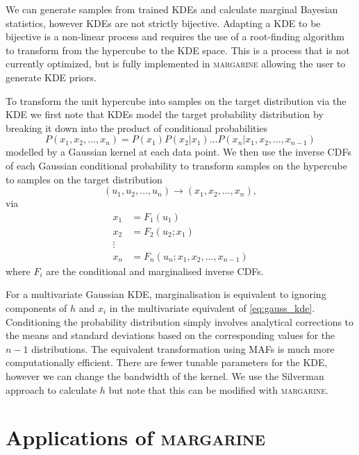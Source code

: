 We can generate samples from trained KDEs and calculate marginal Bayesian statistics, however KDEs are not strictly bijective. Adapting a KDE to be bijective is a non-linear process and requires the use of a root-finding algorithm to transform from the hypercube to the KDE space. This is a process that is not currently optimized, but is fully implemented in \textsc{margarine} allowing the user to generate KDE priors.

To transform the unit hypercube into samples on the target distribution via the KDE we first note that KDEs model the target probability distribution by breaking it down into the product of conditional probabilities
\begin{equation}
    P(x_1, x_2, \hdots, x_n) = P(x_1) P(x_2|x_1) \hdots P(x_n | x_1, x_2, \hdots, x_{n-1})
\end{equation}
modelled by a Gaussian kernel at each data point. We then use the inverse CDFs of each Gaussian conditional probability to transform samples on the hypercube to samples on the target distribution
\begin{equation}
    (u_1, u_2, \hdots, u_n) \rightarrow (x_1, x_2, \hdots, x_n),
\end{equation}
via
\begin{equation}
    \begin{split}
       x_1 & = F_1(u_1) \\
        x_2 & = F_2(u_2;x_1) \\
        \vdots & \\
       x_n & = F_n(u_n;x_1, x_2, \hdots, x_{n-1})
    \end{split}
\end{equation}
where $F_i$ are the conditional and marginalised inverse CDFs. 

For a multivariate Gaussian KDE, marginalisation is equivalent to ignoring components of $h$ and $x_i$ in the multivariate equivalent of \cref{eq:gauss_kde}. Conditioning the probability distribution simply involves analytical corrections to the means and standard deviations based on the corresponding values for the $n-1$ distributions. The equivalent transformation using MAFs is much more computationally efficient. There are fewer tunable parameters for the KDE, however we can change the bandwidth of the kernel. We use the Silverman~\cite{silverman2018density} approach to calculate $h$ but note that this can be modified with \textsc{margarine}.

\section{Applications of \textsc{margarine}}
\label{sec:applications}

